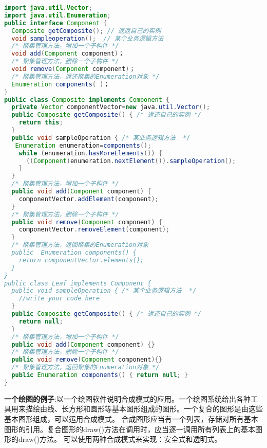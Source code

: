 \documentclass[../main.tex]{subfiles}
\begin{document}
\begin{lstlisting}[language=java]
import java.util.Vector;
import java.util.Enumeration;
public interface Component {
  Composite getComposite(); // 返返自己的实例
  void sampleoperation();  // 某个业务逻辑方法
  /* 聚集管理方法，增加一个子构件 */
  void add(Component component)；
  /* 聚集管理方法，删除一个子构件 */
  void remove(Component component)；
  /* 聚集管理方法，返还聚集的Enumeration对象 */
  Enumeration components( )；
}
public class Composite implements Component {
  private Vector componentVector=new java.util.Vector();
  public Composite getComposite() { /* 返还自己的实例 */
    return this;
  }
  public void sampleOperation { /* 某业务逻辑方法  */
   Enumeration enumeration=components();
    while (enumeration.hasMoreElements()) {
      ((Component)enumeration.nextElement()).sampleOperation();
    }
  }
  /* 聚集管理方法，增加一个子构件 */
  public void add(Component component) {
    componentVector.addElement(component);
  }
  /* 聚集管理方法，删除一个子构件 */
  public void remove(Component component) {
    componentVector.removeElement(component);
  }
  /* 聚集管理方法，返回聚集的Enumeration对象
  public  Enumeration components() {
    return componentVector.elements();
  }
}
public class Leaf implements Component {
  public void sampleOperation { /* 某个业务逻辑方法  */
    //write your code here
  }
  public Composite getComposite() { /* 返还自己的实例 */
    return null;
  }
  /* 聚集管理方法，增加一个子构件 */
  public void add(Component component) {}
  /* 聚集管理方法，删除一个子构件 */
  public void remove(Component component){}
  /* 聚集管理方法，返回聚集的Enumeration对象 */
  public Enumeration components() { return null; }
}
\end{lstlisting}
%
\textbf{一个绘图的例子}:以一个绘图软件说明合成模式的应用。一个绘图系统给出各种工具用来描绘由线、长方形和圆形等基本图形组成的图形。一个复合的图形是由这些基本图形组成，可以运用合成模式。
合成图形应当有一个列表，存储对所有基本图形的引用。复合图形的draw()方法在调用时，应当逐一调用所有列表上的基本图形的draw()方法。
可以使用两种合成模式来实现：安全式和透明式。
%
\end{document}
